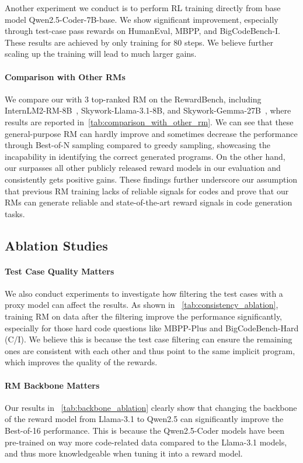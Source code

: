 Another experiment we conduct is to perform RL training directly from base model Qwen2.5-Coder-7B-base. We show significant improvement, especially through test-case pass rewards on HumanEval, MBPP, and BigCodeBench-I. These results are achieved by only training for 80 steps. We believe further scaling up the training will lead to much larger gains.

\paragraph{Comparison with Other RMs}

We compare our \RM with 3 top-ranked RM on the RewardBench, including InternLM2-RM-8B~\citep{cai2024internlm2}, Skywork-Llama-3.1-8B, and Skywork-Gemma-27B~\citep{skywork}, where results are reported in~\autoref{tab:comparison_with_other_rm}. We can see that these general-purpose RM can hardly improve and sometimes decrease the performance through Best-of-N sampling compared to greedy sampling, showcasing the incapability in identifying the correct generated programs. On the other hand, our \RM surpasses all other publicly released reward models in our evaluation and consistently gets positive gains. These findings further underscore our assumption that previous RM training lacks of reliable signals for codes and prove that our RMs can generate reliable and state-of-the-art reward signals in code generation tasks.

\subsection{Ablation Studies}

\paragraph{Test Case Quality Matters}


We also conduct experiments to investigate how filtering the test cases with a proxy model can affect the results. As shown in ~\autoref{tab:consistency_ablation}, training RM on data after the filtering improve the performance significantly, especially for those hard code questions like MBPP-Plus and BigCodeBench-Hard (C/I). We believe this is because the test case filtering can ensure the remaining ones are consistent with each other and thus point to the same implicit program, which improves the quality of the rewards.

\paragraph{RM Backbone Matters}
Our results in ~\autoref{tab:backbone_ablation} clearly show that changing the backbone of the reward model from Llama-3.1 to Qwen2.5 can significantly improve the Best-of-16 performance. This is because the Qwen2.5-Coder models have been pre-trained on way more code-related data compared to the Llama-3.1 models, and thus more knowledgeable when tuning it into a reward model.



